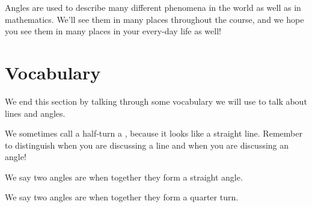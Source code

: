\documentclass{ximera}
\begin{document}
Angles are used to describe many different phenomena in the world as well as in mathematics. We'll see them in many places throughout the course, and we hope you see them in many places in your every-day life as well!

\section{Vocabulary}

We end this section by talking through some vocabulary we will use to talk about lines and angles.

We sometimes call a half-turn a , because it looks like a straight line. Remember to distinguish when you are discussing a line and when you are discussing an angle!
\begin{image}
\end{image}

We say two angles are  when together they form a straight angle. 
\begin{image}
\end{image}

We say two angles are  when together they form a quarter turn.

\begin{image}
\end{image}
\end{document}
